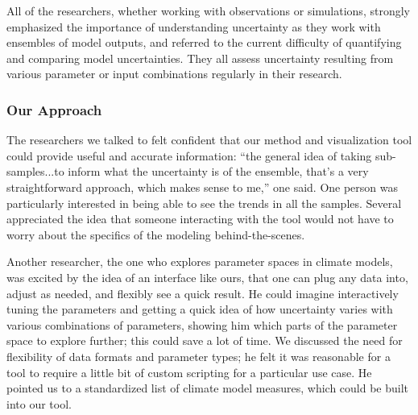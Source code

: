 

All of the researchers, whether working with observations or simulations, strongly emphasized the importance of understanding uncertainty as they work with ensembles of model outputs, and referred to the current difficulty of quantifying and comparing model uncertainties. 
They all assess uncertainty resulting from various parameter or input combinations regularly in their research.


\subsubsection{Our Approach}
The researchers we talked to felt confident that our method and visualization tool could provide useful and accurate information: ``the general idea of taking sub-samples...to inform what the uncertainty is of the ensemble, that's a very straightforward approach, which makes sense to me,'' one said. One person was particularly interested in being able to see the trends in all the samples. Several appreciated the idea that someone interacting with the tool would not have to worry about the specifics of the modeling behind-the-scenes.

Another researcher, the one who explores parameter spaces in climate models, was excited by the idea of an interface like ours, that one can plug any data into, adjust as needed, and flexibly see a quick result. He could imagine interactively tuning the parameters and getting a quick idea of how uncertainty varies with various combinations of parameters, showing him which parts of the parameter space to explore further; this could save a lot of time. We discussed the need for flexibility of data formats and parameter types; he felt it was reasonable for a tool to require a little bit of custom scripting for a particular use case. He pointed us to a standardized list of climate model measures, which could be built into our tool.

